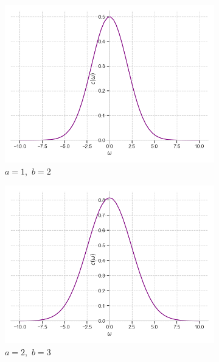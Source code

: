 \documentclass[a4paper, 16pt]{article}
\begin{document}
    \begin{figure}[htbp]
        \centering
        \begin{subfigure}{0.3\textwidth}
            \centering
            \includegraphics[width=\linewidth]{gausfimg_a=1_b=2.png}
            \caption{$a=1,\,\,b=2$}
            \label{fig:gausfimg_1}
        \end{subfigure}
        \hfill
        \begin{subfigure}{0.3\textwidth}
            \centering
            \includegraphics[width=\linewidth]{gausfimg_a=2_b=3.png}
            \caption{$a=2,\,\,b=3$}
            \label{fig:gausfimg_2}
        \end{subfigure}
        \hfill
        \begin{subfigure}{0.3\textwidth}

\end{subfigure}
\end{figure}
\end{document}
